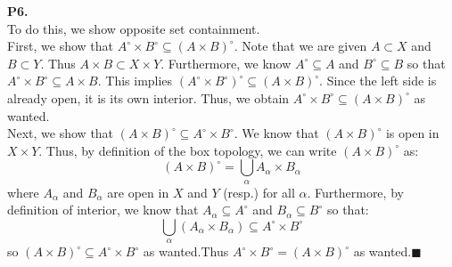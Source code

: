 \documentclass{article}
\begin{document}
    \textbf{P6.}\\
    To do this, we show opposite set containment.\\
    First, we show that $A^{\circ}\times B^{\circ} \subseteq (A\times B)^{\circ}$. Note that we are given $A\subset X$ and
    $B\subset Y$. Thus $A\times B\subset X\times Y$. Furthermore, we know $A^{\circ}\subseteq A$ and $B^{\circ}\subseteq B$
    so that $A^{\circ}\times B^{\circ}\subseteq A \times B$. This implies $(A^{\circ}\times B^{\circ})^{\circ}\subseteq
    (A\times B)^{\circ}$. Since the left side is already open, it is its own interior. Thus, we obtain 
    $A^{\circ}\times B^{\circ}\subseteq (A\times B)^{\circ}$ as wanted.\\
    Next, we show that $(A\times B)^{\circ}\subseteq A^{\circ}\times B^{\circ}$. We know that $(A\times B)^{\circ}$ is open
    in $X\times Y$. Thus, by definition of the box topology, we can write $(A\times B)^{\circ}$ as:
    \[ (A\times B)^{\circ} = \bigcup_{\alpha} A_{\alpha} \times B_{\alpha} \]
    where $A_{\alpha}$ and $B_{\alpha}$ are open in $X$ and $Y$ (resp.) for all $\alpha$. Furthermore, by definition of
    interior, we know that $A_{\alpha}\subseteq A^{\circ}$ and $B_{\alpha}\subseteq B^{\circ}$ so that:
    \[ \bigcup_{\alpha} (A_{\alpha}\times B_{\alpha}) \subseteq A^{\circ} \times B^{\circ} \]
    so $(A\times B)^{\circ} \subseteq A^{\circ} \times B^{\circ}$ as wanted.Thus 
    $A^{\circ} \times B^{\circ} = (A\times B)^{\circ}$ as wanted.\hfill$\blacksquare$\\
\end{document}
